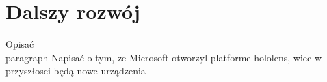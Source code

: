 \newpage
\section{Dalszy rozwój}
{\color{red}Opisać}
\\paragraph{}
{\color{red}Napisać o tym, ze Microsoft otworzyl platforme hololens, wiec w przyszłosci będą nowe urządzenia}
